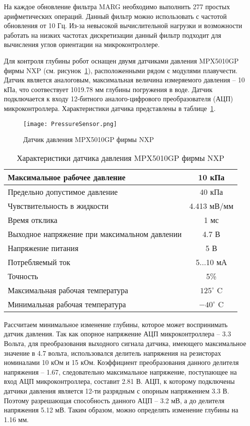 На каждое обновление фильтра MARG необходимо выполнить 277 простых арифметических операций. Данный фильтр можно использовать с частотой обновления от 10 Гц. Из-за невысокой вычислительной нагрузки и возможности работать на низких частотах дискретизации данный фильтр подходит для вычисления углов ориентации на микроконтроллере. 





Для контроля глубины робот оснащен двумя датчиками давления MPX5010GP фирмы NXP (см. рисунок~\ref{PressureSensor}), расположенными рядом с модулями плавучести. Датчик является аналоговым, максимальная величина измеряемого давления -- 10 кПа, что соотвествует 1019.78 мм глубины погружения в воде. Датчик подключается к входу 12-битного аналого-цифрового преобразователя (АЦП) микроконтроллера. Характеристики датчика представлены в таблице~\ref{tabPressure}.

\begin{figure}[h]
	\centering
	\texttt{[image: PressureSensor.png]}%
	\caption{Датчик давления MPX5010GP фирмы NXP}
	\label{PressureSensor}
\end{figure}

\begin{table}[h]
	\centering
	\caption{Характеристики датчика давления MPX5010GP фирмы NXP}\label{tabPressure}
	\begin{tabular}{|l|c|}
		\hline
		Максимальное рабочее давление	&	10 кПа 	\\ \hline
		Предельно допустимое давление & 40 кПа \\ \hline
		Чувствительность в жидкости	& 4.413 мВ/мм \\ \hline
		Время отклика 	& 1 мс \\ \hline
		Выходное напряжение при максимальном давлении	&  4.7 В\\ \hline
		Напряжение питания 	& 5 В\\ \hline	
		Потребляемый ток	& 5...10 мА\\ \hline	
		Точность	& 5\% \\ \hline
		Максимальная рабочая температура	&	$125^\circ$ C 	\\ \hline
		Минимальная рабочая температура 	&	$-40^\circ$ C \\ \hline
	\end{tabular}
\end{table}

Рассчитаем минимальное изменение глубины, которое может воспринимать датчик давления. Так как опорное напряжение АЦП микроконтроллера -- 3.3 Вольта, для преобразования выходного сигнала датчика, имеющего максимальное значение в 4.7 вольта, использовался делитель напряжения на резисторах номиналами 10 кОм и 15 кОм. Коэффициент преобразования данного делителя напряжения -- 1.67, следовательно максимальное напряжение, поступающее на вход АЦП микроконтроллера, составит 2.81 В. АЦП, к которому подключены датчики давления является 12-ти разрядным с опорным напряжением 3.3 В. Поэтому разрешающая способность данного АЦП -- 3.2 мВ, а до делителя напряжения 5.12 мВ. Таким образом, можно определять изменение глубины на 1.16 мм.



